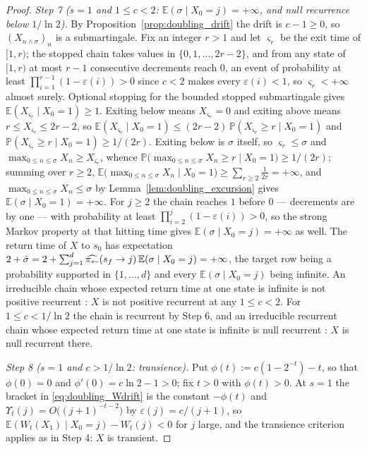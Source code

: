 \begin{proof}
\emph{Step 7 ($s=1$ and $1\leq c<2$: $\mathbb E(\sigma\mid X_0=j)=+\infty$, and null recurrence below
$1/\ln2$).} By Proposition~\ref{prop:doubling_drift} the drift is $c-1\geq0$, so
$(X_{n\wedge\sigma})_n$ is a submartingale. Fix an integer $r>1$ and let $\varsigma_r$ be the
exit time of $[1,r)$; the stopped chain takes values in $\{0,1,\dots,2r-2\}$, and from any
state of $[1,r)$ at most $r-1$ consecutive decrements reach $0$, an event of probability at
least $\prod_{i=1}^{r-1}(1-\varepsilon(i))>0$ since $c<2$ makes every $\varepsilon(i)<1$, so
$\varsigma_r<+\infty$ almost surely. Optional stopping for the bounded stopped submartingale
gives $\mathbb E(X_{\varsigma_r}\mid X_0=1)\geq1$. Exiting below means $X_{\varsigma_r}=0$ and exiting
above means $r\leq X_{\varsigma_r}\leq2r-2$, so
$\mathbb E(X_{\varsigma_r}\mid X_0=1)\leq(2r-2)\,\mathbb P(X_{\varsigma_r}\geq r\mid X_0=1)$ and
$\mathbb P(X_{\varsigma_r}\geq r\mid X_0=1)\geq1/(2r)$. Exiting below is $\sigma$ itself, so
$\varsigma_r\leq\sigma$ and $\max_{0\leq n\leq\sigma}X_n\geq X_{\varsigma_r}$, whence
$\mathbb P\bigl(\max_{0\leq n\leq\sigma}X_n\geq r\mid X_0=1\bigr)\geq1/(2r)$; summing over $r\geq2$,
$\mathbb E\bigl(\max_{0\leq n\leq\sigma}X_n\mid X_0=1\bigr)\geq\sum_{r\geq2}\frac1{2r}=+\infty$, and
$\max_{0\leq n\leq\sigma}X_n\leq\sigma$ by Lemma~\ref{lem:doubling_excursion} gives
$\mathbb E(\sigma\mid X_0=1)=+\infty$. For $j\geq2$ the chain reaches $1$ before $0$ --- decrements
are by one --- with probability at least $\prod_{i=2}^{j}(1-\varepsilon(i))>0$, so the strong
Markov property at that hitting time gives $\mathbb E(\sigma\mid X_0=j)=+\infty$ as well. The return
time of $X$ to $s_0$ has expectation
$2+\bar\sigma=2+\sum_{j=1}^{d}\widehat{\pi_{\leftarrow}}(s_f\rightarrow j)\,\mathbb E(\sigma\mid X_0=j)=+\infty$,
the target row being a probability supported in $\{1,\dots,d\}$ and every
$\mathbb E(\sigma\mid X_0=j)$ being infinite. An irreducible chain whose expected return time
at one state is infinite is not positive recurrent \citep{levin2017markov}: $X$ is not
positive recurrent at any $1\leq c<2$. For $1\leq c<1/\ln2$ the chain is recurrent by Step 6,
and an irreducible recurrent chain whose expected return time at one state is infinite is
null recurrent \citep{levin2017markov}: $X$ is null recurrent there.

\emph{Step 8 ($s=1$ and $c>1/\ln2$: transience).} Put $\phi(t):=c(1-2^{-t})-t$, so that
$\phi(0)=0$ and $\phi'(0)=c\ln2-1>0$; fix $t>0$ with $\phi(t)>0$. At $s=1$ the bracket in
\eqref{eq:doubling_Wdrift} is the constant $-\phi(t)$ and
$\Upsilon_t(j)=O\bigl((j+1)^{-t-2}\bigr)$ by $\varepsilon(j)=c/(j+1)$, so
$\mathbb E(W_t(X_1)\mid X_0=j)-W_t(j)<0$ for $j$ large, and the transience criterion applies as in
Step 4: $X$ is transient.
\end{proof}

